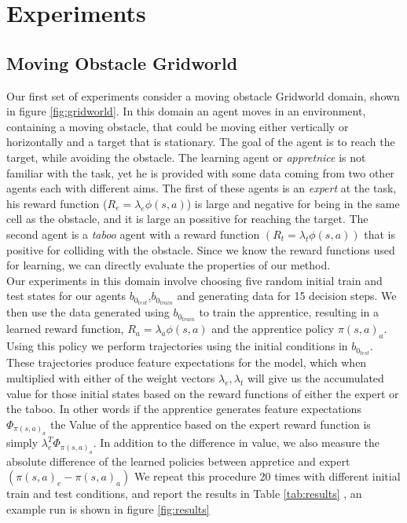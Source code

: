 \documentclass[letterpaper]{article}
\begin{document}
\section{Experiments}
\subsection{Moving Obstacle Gridworld}
Our first set of experiments consider a moving obstacle Gridworld domain, shown in figure \ref{fig:gridworld}.
In this domain an agent moves in an environment, containing a moving obstacle, that could be moving either vertically
or horizontally and a target that is stationary. The goal of the agent is to reach the target, while avoiding 
the obstacle. The learning agent or \emph{appretnice} is not familiar with the task, yet he is provided with some data coming from two other agents
each with different aims. The first of these agents is an \emph{expert} at the task, his reward function ($R_e = \lambda_e\phi(s,a)$) is large and negative
for being in the same cell as the obstacle, and it is large an possitive for reaching the target. The second agent is a
\emph{taboo} agent with a reward function $(R_t=\lambda_t\phi(s,a))$ that is positive for colliding with the obstacle. Since we know the reward functions used for learning, we can directly evaluate the properties of our method. \\
Our experiments in this domain involve choosing five random initial train and test states for our agents $b_{0_{test}}$,$b_{0_{train}}$ and generating data for 15 decision steps. We then use the data generated using $b_{0_{train}}$ to train the apprentice, resulting in a learned reward function, $R_a = \lambda_a\phi(s,a)$ and the apprentice policy $\pi(s,a)_a$. Using this policy we perform trajectories using the initial conditions in $b_{0_{test}}$. These trajectories produce feature expectations for the model, which when multiplied with either of the weight vectors $\lambda_e,\lambda_t$ will give us the accumulated value for those initial states based on the reward functions of either the expert or the taboo. In other words if the apprentice generates feature expectations $\Phi_{\pi(s,a)_a}$ the Value of the apprentice based on the expert reward function is simply $\lambda_e^T\Phi_{\pi(s,a)_a}$. In addition to the difference in value, we also measure the absolute difference of the learned policies between appretice and expert $(\pi(s,a)_e - \pi(s,a)_a)$ We repeat this procedure 20 times with different initial train and test conditions, and report the results in Table \ref{tab:results} , an example run is shown in figure \ref{fig:results}
\end{document}
